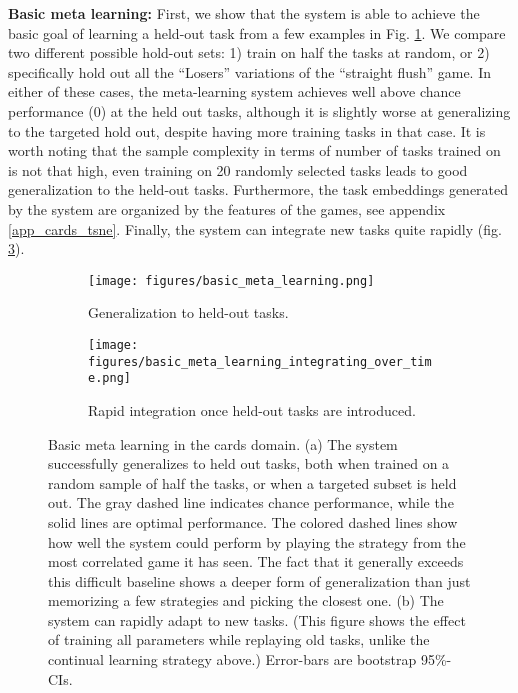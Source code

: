 \documentclass{article}
\begin{document}
\textbf{Basic meta learning:} First, we show that the system is able to achieve the basic goal of learning a held-out task from a few examples in Fig. \ref{cards_basic_results}. We compare two different possible hold-out sets: 1) train on half the tasks at random, or 2) specifically hold out all the ``Losers'' variations of the ``straight flush'' game. In either of these cases, the meta-learning system achieves well above chance performance (0) at the held out tasks, although it is slightly worse at generalizing to the targeted hold out, despite having more training tasks in that case. It is worth noting that the sample complexity in terms of number of tasks trained on is not that high, even training on 20 randomly selected tasks leads to good generalization to the held-out tasks. Furthermore, the task embeddings generated by the system are organized by the features of the games, see appendix \ref{app_cards_tsne}. Finally, the system can integrate new tasks quite rapidly (fig. \ref{cards_basic_integration_results}).\par
\begin{figure}
\centering
\begin{subfigure}[t]{0.5\textwidth}
\texttt{[image: figures/basic\_meta\_learning.png]}
\caption{Generalization to held-out tasks.}
\label{cards_basic_results}
\end{subfigure}%
\begin{subfigure}[t]{0.5\textwidth}
\texttt{[image: figures/basic\_meta\_learning\_integrating\_over\_time.png]}
\caption{Rapid integration once held-out tasks are introduced.}
\label{cards_basic_integration_results}
\end{subfigure}
\caption{Basic meta learning in the cards domain. (a) The system successfully generalizes to held out tasks, both when trained on a random sample of half the tasks, or when a targeted subset is held out. The gray dashed line indicates chance performance, while the solid lines are optimal performance. The colored dashed lines show how well the system could perform by playing the strategy from the most correlated game it has seen. The fact that it generally exceeds this difficult baseline shows a deeper form of generalization than just memorizing a few strategies and picking the closest one. (b) The system can rapidly adapt to new tasks. (This figure shows the effect of training all parameters while replaying old tasks, unlike the continual learning strategy above.) Error-bars are bootstrap 95\%-CIs.}
\end{figure}
\end{document}
